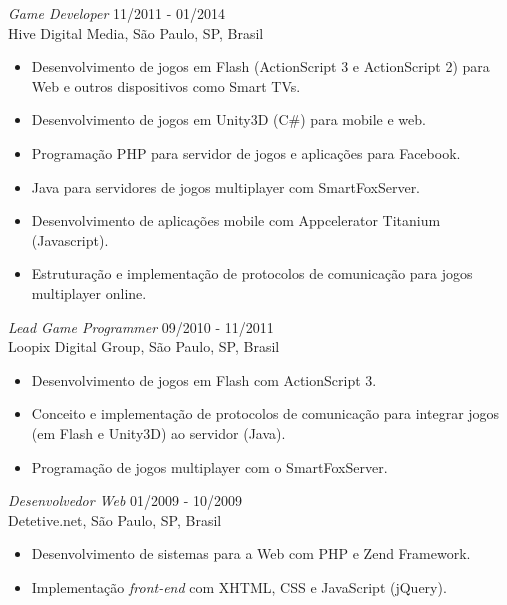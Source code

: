 \documentclass[line,margin]{res}
\begin{document}
\begin{resume}
		        {\sl Game Developer} \hfill 11/2011 - 01/2014 \\
                Hive Digital Media, São Paulo, SP, Brasil
                 \begin{itemize}  \itemsep 1.25pt
                 \item Desenvolvimento de jogos em Flash (ActionScript 3 e ActionScript 2) para Web e outros dispositivos como Smart TVs.
		         \item Desenvolvimento de jogos em Unity3D (C\#) para mobile e web.
                 \item Programação PHP para servidor de jogos e aplicações para Facebook.
                 \item Java para servidores de jogos multiplayer com SmartFoxServer.
		         \item Desenvolvimento de aplicações mobile com Appcelerator Titanium (Javascript).
                 \item Estruturação e implementação de protocolos de comunicação para jogos multiplayer online.
                 \end{itemize}
                 
                {\sl Lead Game Programmer} \hfill 09/2010 - 11/2011 \\
                Loopix Digital Group, São Paulo, SP, Brasil
                 \begin{itemize}  \itemsep 1.25pt
                 \item Desenvolvimento de jogos em Flash com ActionScript 3.
                 \item Conceito e implementação de protocolos de comunicação para integrar jogos (em Flash e Unity3D) ao servidor (Java).
                 \item Programação de jogos multiplayer com o SmartFoxServer.
                 \end{itemize}
 
                {\sl Desenvolvedor Web} \hfill 01/2009 - 10/2009 \\
                Detetive.net, São Paulo, SP, Brasil
                 \begin{itemize}  \itemsep 1.25pt
                 \item Desenvolvimento de sistemas para a Web com PHP e Zend Framework.
                 \item Implementação {\sl front-end} com XHTML, CSS e JavaScript (jQuery).
                 \end{itemize} 


\end{resume}
\end{document}

